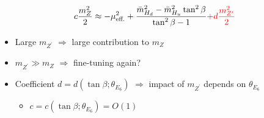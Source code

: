 \documentclass[10pt,aspectratio=169]{beamer}
\begin{document}
\begin{frame}
\begin{columns}[t]
\begin{column}{0.5\textwidth}
{\begin{equation*}
        c \frac{m_Z^2}{2} \approx -\mu_{\text{eff.}}^2
          + \frac{\bar{m}_{H_d}^2 - \bar{m}_{H_u}^2 \tan^2\beta}
          {\tan^2\beta - 1} {\color{red} + d \frac{m_{Z'}^2}{2}}
      \end{equation*}}
      \begin{itemize} \itemsep1em
        \item Large $m_{Z^\prime}$ $\Rightarrow$ \alert{large
          contribution to $m_Z$}
        \item $m_{Z^\prime} \gg m_Z$ $\Rightarrow$ fine-tuning again?
        \item Coefficient $d = d(\tan\beta; \theta_{E_6})$ $\Rightarrow$
          impact of $m_{Z^\prime}$ depends on $\theta_{E_6}$
          \begin{itemize}
            \item $c = c(\tan\beta; \theta_{E_6}) = O(1)$
          \end{itemize}
      \end{itemize}
      \begin{figure}
        \centering
      \end{figure}
    \end{column}
  \end{columns}
\end{frame}
\end{document}
